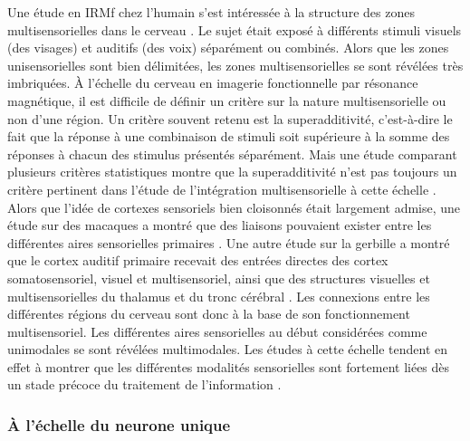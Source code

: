 Une étude en IRMf chez l'humain s'est intéressée à la structure des zones multisensorielles dans le cerveau \cite{beauchamp_unraveling_2004}. Le sujet était exposé à différents stimuli visuels (des visages) et auditifs (des voix) séparément ou combinés. Alors que les zones unisensorielles sont bien délimitées, les zones multisensorielles se sont révélées très imbriquées.
À l'échelle du cerveau en imagerie fonctionnelle par résonance magnétique, il est difficile de définir un critère sur la nature multisensorielle ou non d'une région. Un critère souvent retenu est la superadditivité, c'est-à-dire le fait que la réponse à une combinaison de stimuli soit supérieure à la somme des réponses à chacun des stimulus présentés séparément. Mais une étude comparant plusieurs critères statistiques montre que la superadditivité n'est pas toujours un critère pertinent dans l'étude de l'intégration multisensorielle à cette échelle \cite{beauchamp_statistical_2005}.
Alors que l'idée de cortexes sensoriels bien cloisonnés était largement admise, une étude sur des macaques a montré que des liaisons pouvaient exister entre les différentes aires sensorielles primaires \cite{brosch_nonauditory_2005}. Une autre étude sur la gerbille a montré que le cortex auditif primaire recevait des entrées directes des cortex somatosensoriel, visuel et multisensoriel, ainsi que des structures visuelles et multisensorielles du thalamus et du tronc cérébral \cite{budinger_multisensory_2006}.
Les connexions entre les différentes régions du cerveau sont donc à la base de son fonctionnement multisensoriel. Les différentes aires sensorielles au début considérées comme unimodales se sont révélées multimodales. Les études à cette échelle tendent en effet à montrer que les différentes modalités sensorielles sont fortement liées dès un stade précoce du traitement de l'information \cite{stein_multisensory_2008}.


\subsubsection{À l'échelle du neurone unique}

